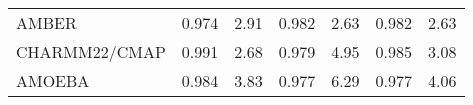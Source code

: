\begin{table}[h]
\begin{center}
\begin{threeparttable}
\begin{tabular}{l r r r r r r}
AMBER          & 0.974  & 2.91  &  0.982   &2.63  &  0.982   &2.63\\
CHARMM22/CMAP  & 0.991  & 2.68  &  0.979   &4.95  &  0.985   &3.08\\
AMOEBA         & 0.984  & 3.83  &  0.977   &6.29  &  0.977   &4.06\\
    \end{tabular}
    \end{threeparttable}
    \end{center}
    \label{tab:procs_results}
\end{table}






